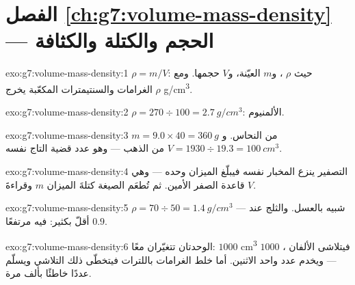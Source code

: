\section*{الفصل \ref{ch:g7:volume-mass-density} --- الحجم والكتلة والكثافة}

\begin{solution}{exo:g7:volume-mass-density:1}
$\rho = m/V$: حيث $\rho$ ، و$m$  العيّنة، و$V$ حجمها.
ومع الغرامات والسنتيمترات المكعّبة يخرج $\rho$
 \unit{g/cm^3}.
\end{solution}

\begin{solution}{exo:g7:volume-mass-density:2}
$\rho = 270 \div 100 = \qty{2.7}{g/cm^3}$: الألمنيوم.
\end{solution}

\begin{solution}{exo:g7:volume-mass-density:3}
$m = 9.0 \times 40 = \qty{360}{g}$ من النحاس.
و$V = 1930 \div 19.3 = \qty{100}{cm^3}$ من الذهب --- وهو عدد
قضية التاج نفسه.
\end{solution}

\begin{solution}{exo:g7:volume-mass-density:4}
التصفير ينزع  المخبار نفسه فيبلّغ الميزان  وحده ---
وهي قاعدة الصفر الأمين. ثم تُطعَم الصيغة كتلةَ الميزان $m$
وقراءةَ  $V$.
\end{solution}

\begin{solution}{exo:g7:volume-mass-density:5}
$\rho = 70 \div 50 = \qty{1.4}{g/cm^3}$ --- شبيه بالعسل.
والثلج عند $0.9$ أقلّ  بكثير:  فيه مرتفعًا.
\end{solution}

\begin{solution}{exo:g7:volume-mass-density:6}
الوحدتان تتغيّران معًا:  $1000$ \unit{cm^3} 
$1000$ ، فيتلاشى الألفان --- ويخدم عدد واحد الاثنين. أما
خلط الغرامات باللترات فيتخطّى ذلك التلاشي ويسلّم عددًا خاطئًا
بألف مرة.
\end{solution}

